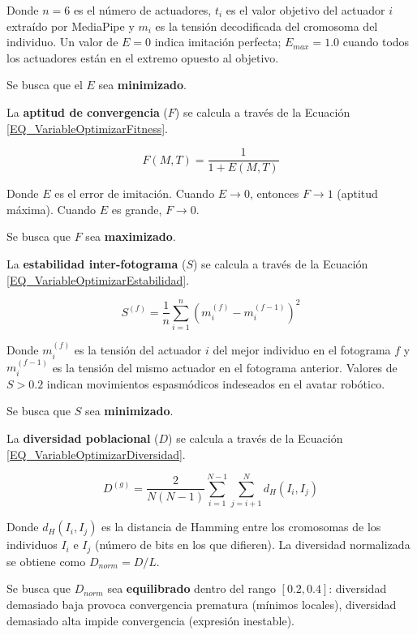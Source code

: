Donde $n = 6$ es el número de actuadores, $t_i$ es el valor objetivo del actuador $i$ extraído por MediaPipe y $m_i$ es la tensión decodificada del cromosoma del individuo. Un valor de $E = 0$ indica imitación perfecta; $E_{max} = 1.0$ cuando todos los actuadores están en el extremo opuesto al objetivo.

Se busca que el $E$ sea \textbf{minimizado}.

La \textbf{aptitud de convergencia} ($F$) se calcula a través de la Ecuación \ref{EQ_VariableOptimizarFitness}.

\begin{equation}
    F(M, T) = \frac{1}{1 + E(M, T)}
    \label{EQ_VariableOptimizarFitness}
\end{equation}

Donde $E$ es el error de imitación. Cuando $E \to 0$, entonces $F \to 1$ (aptitud máxima). Cuando $E$ es grande, $F \to 0$.

Se busca que $F$ sea \textbf{maximizado}.

La \textbf{estabilidad inter-fotograma} ($S$) se calcula a través de la Ecuación \ref{EQ_VariableOptimizarEstabilidad}.

\begin{equation}
    S^{(f)} = \frac{1}{n} \sum_{i=1}^{n} \left( m_i^{(f)} - m_i^{(f-1)} \right)^2
    \label{EQ_VariableOptimizarEstabilidad}
\end{equation}

Donde $m_i^{(f)}$ es la tensión del actuador $i$ del mejor individuo en el fotograma $f$ y $m_i^{(f-1)}$ es la tensión del mismo actuador en el fotograma anterior. Valores de $S > 0.2$ indican movimientos espasmódicos indeseados en el avatar robótico.

Se busca que $S$ sea \textbf{minimizado}.

La \textbf{diversidad poblacional} ($D$) se calcula a través de la Ecuación \ref{EQ_VariableOptimizarDiversidad}.

\begin{equation}
    D^{(g)} = \frac{2}{N(N-1)} \sum_{i=1}^{N-1} \sum_{j=i+1}^{N} d_H(I_i, I_j)
    \label{EQ_VariableOptimizarDiversidad}
\end{equation}

Donde $d_H(I_i, I_j)$ es la distancia de Hamming entre los cromosomas de los individuos $I_i$ e $I_j$ (número de bits en los que difieren). La diversidad normalizada se obtiene como $D_{norm} = D / L$.

Se busca que $D_{norm}$ sea \textbf{equilibrado} dentro del rango $[0.2, 0.4]$: diversidad demasiado baja provoca convergencia prematura (mínimos locales), diversidad demasiado alta impide convergencia (expresión inestable).



